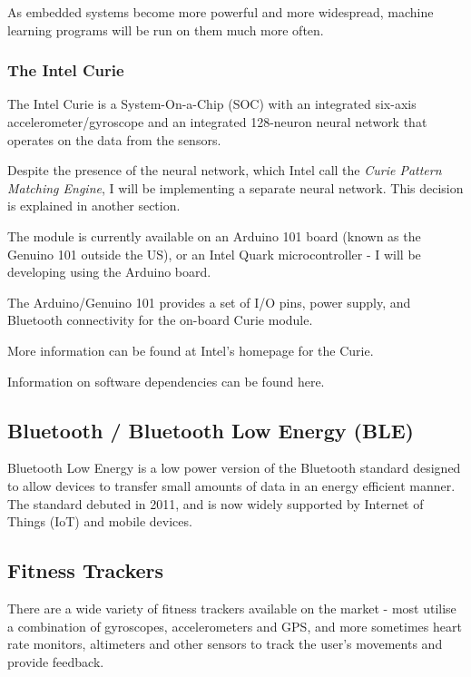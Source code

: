 \documentclass[a4paper]{article}
\begin{document}
As embedded systems become more powerful and more widespread, machine learning programs will be run on them much more often.

\subsubsection{The Intel Curie}

The Intel Curie is a System-On-a-Chip (SOC) with an integrated six-axis accelerometer/gyroscope and an integrated 128-neuron neural network that operates on the data from the sensors.

Despite the presence of the neural network, which Intel call the \textit{Curie Pattern Matching Engine}\cite{bgref6}, I will be implementing a separate neural network. This decision is explained in another section. 

The module is currently available on an Arduino 101 board (known as the Genuino 101 outside the US), or an Intel Quark microcontroller - I will be developing using the Arduino board.

The Arduino/Genuino 101 provides a set of I/O pins, power supply, and Bluetooth connectivity for the on-board Curie module.

More information can be found at Intel's homepage for the Curie\cite{bgref6}.

Information on software dependencies can be found here. 

\subsection{Bluetooth / Bluetooth Low Energy (BLE)}%

Bluetooth Low Energy\cite{bgref7} is a low power version of the Bluetooth standard designed to allow devices to transfer small amounts of data in an energy efficient manner. The standard debuted in 2011, and is now widely supported by Internet of Things (IoT) and mobile devices.

\subsection{Fitness Trackers}%

There are a wide variety of fitness trackers available on the market - most utilise a combination of gyroscopes, accelerometers and GPS, and more sometimes heart rate monitors, altimeters and other sensors to track the user's movements and provide feedback.
\end{document}

